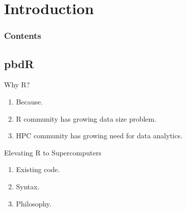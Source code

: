 \section{Introduction}

\hidenum
\begin{frame}[noframenumbering]
\frametitle{Contents}
\end{frame}
\shownum

\subsection{pbdR}

\begin{frame}
  \begin{block}{Why R?}
    \pause
    \begin{enumerate}[<+-|alert@+>]
      \item Because.
      \item R community has growing data size problem.
      \item HPC community has growing need for data analytics.
    \end{enumerate}
  \end{block}
\end{frame}


\begin{frame}
  \begin{block}{Elevating R to Supercomputers}
  \pause
    \begin{enumerate}[<+-|alert@+>]
      \item Existing code.
      \item Syntax.
      \item Philosophy.
    \end{enumerate}
  \end{block}
\end{frame}


